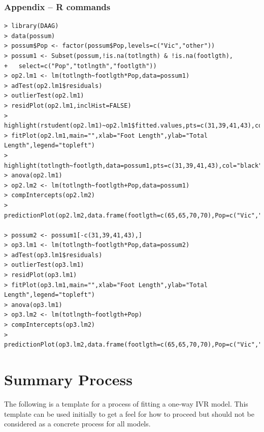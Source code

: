 \documentclass[10pt,openany]{book}\usepackage[]{graphicx}\usepackage[]{color}
\begin{document}
\subsubsection*{Appendix -- R commands}
\begin{Verbatim}[formatcom=\color{red},xleftmargin=5mm,commandchars=\\\{\}]
> library(DAAG)
> data(possum)
> possum$Pop <- factor(possum$Pop,levels=c("Vic","other"))
> possum1 <- Subset(possum,!is.na(totlngth) & !is.na(footlgth),
+   select=c("Pop","totlngth","footlgth"))
> op2.lm1 <- lm(totlngth~footlgth*Pop,data=possum1)
> adTest(op2.lm1$residuals)
> outlierTest(op2.lm1)
> residPlot(op2.lm1,inclHist=FALSE)
> highlight(rstudent(op2.lm1)~op2.lm1$fitted.values,pts=c(31,39,41,43),col="black")
> fitPlot(op2.lm1,main="",xlab="Foot Length",ylab="Total Length",legend="topleft")
> highlight(totlngth~footlgth,data=possum1,pts=c(31,39,41,43),col="black")
> anova(op2.lm1)
> op2.lm2 <- lm(totlngth~footlgth+Pop,data=possum1)
> compIntercepts(op2.lm2)
> predictionPlot(op2.lm2,data.frame(footlgth=c(65,65,70,70),Pop=c("Vic","other","Vic","other")))

> possum2 <- possum1[-c(31,39,41,43),]
> op3.lm1 <- lm(totlngth~footlgth*Pop,data=possum2)
> adTest(op3.lm1$residuals)
> outlierTest(op3.lm1)
> residPlot(op3.lm1)
> fitPlot(op3.lm1,main="",xlab="Foot Length",ylab="Total Length",legend="topleft")
> anova(op3.lm1)
> op3.lm2 <- lm(totlngth~footlgth+Pop)
> compIntercepts(op3.lm2)
> predictionPlot(op3.lm2,data.frame(footlgth=c(65,65,70,70),Pop=c("Vic","other","Vic","other")))
\end{Verbatim}



\newpage
\section{Summary Process}
The following is a template for a process of fitting a one-way IVR model.  This template can be used initially to get a feel for how to proceed but should not be considered as a concrete process for all models.
\end{document}
